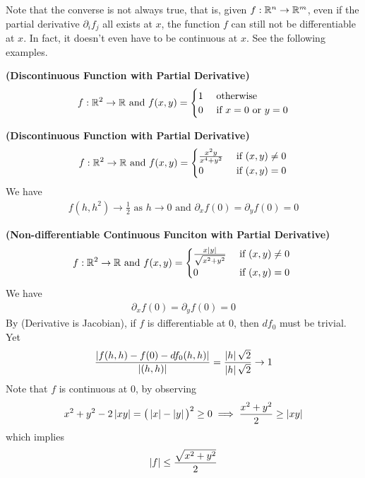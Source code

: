 \documentclass{report}
\begin{document}
\begin{mdframed}
Note that the converse is not always true, that is, given $f:\mathbb{R}^n\rightarrow \mathbb{R}^m$, even if the partial derivative $\partial_if_j$ all exists at $x$, the function $f$ can still not be differentiable at $x$. In fact, it doesn't even have to be continuous at $x$. See the following examples. 
\begin{Example}{\textbf{(Discontinuous Function with Partial Derivative)}}{}
\begin{align*}
f:\mathbb{R}^2\rightarrow \mathbb{R}\text{ and }f(x,y)=\begin{cases}
  1& \text{ otherwise}\\
  0& \text{ if }x=0\text{ or }y=0
\end{cases}
\end{align*}
\end{Example}
\begin{Example}{\textbf{(Discontinuous Function with Partial Derivative)}}{}
\begin{align*}
f:\mathbb{R}^2\rightarrow \mathbb{R}\text{ and }f(x,y)=\begin{cases}
  \frac{x^2y}{x^4+y^2}& \text{ if }(x,y)\neq 0\\
  0& \text{ if }(x,y)=0
\end{cases}
\end{align*}
We have
\begin{align*}
f(h,h^2)\to \frac{1}{2}\text{ as $h\to 0$ and }\partial_xf(0)=\partial _yf(0)=0
\end{align*}
\end{Example}
\begin{Example}{\textbf{(Non-differentiable Continuous Funciton with Partial Derivative)}}{}
\begin{align*}
f:\mathbb{R}^2 \rightarrow \mathbb{R}\text{ and }f(x,y)=\begin{cases}
  \frac{x\left|y\right|}{\sqrt{x^2+y^2} }& \text{ if $(x,y)\neq 0$ }\\
  0& \text{ if $(x,y)=0$ }
\end{cases}
\end{align*}
We have 
\begin{align*}
\partial_xf(0)=\partial_yf(0)=0
\end{align*}
By  (Derivative is Jacobian), if $f$ is differentiable at $0$, then  $df_0$ must be trivial. Yet  
\begin{align*}
\frac{\left|f(h,h)-f(0)-df_0(h,h)\right|}{\left|(h,h)\right|}=\frac{\left|h\right|\sqrt{2} }{\left|h\right|\sqrt{2} }\to 1
\end{align*}
Note that $f$ is continuous at  $0$, by observing 
\begin{align*}
  x^2+y^2- 2\left|xy\right|=\big(\left|x\right|-\left|y\right| \big)^2\geq 0 \implies \frac{x^2+y^2}{2}\geq \left|xy\right|
\end{align*}
which implies 
\begin{align*}
\left|f\right|\leq \frac{\sqrt{x^2+y^2} }{2}
\end{align*}
\end{Example}
\end{mdframed}
\end{document}
